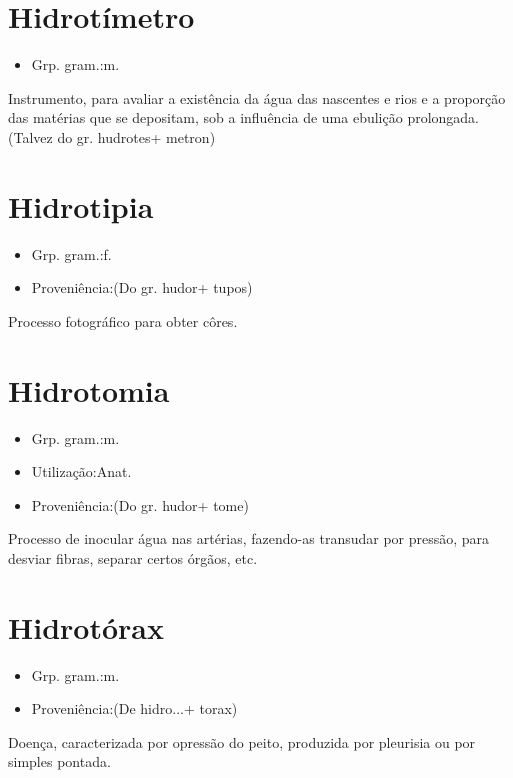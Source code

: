 \documentclass{article}
\begin{document}
\section{Hidrotímetro}
\begin{itemize}
\item {Grp. gram.:m.}
\end{itemize}
Instrumento, para avaliar a existência da água das nascentes e rios e a proporção das matérias que se depositam, sob a influência de uma ebulição prolongada.
(Talvez do gr. \textunderscore hudrotes\textunderscore  + \textunderscore metron\textunderscore )
\section{Hidrotipia}
\begin{itemize}
\item {Grp. gram.:f.}
\end{itemize}
\begin{itemize}
\item {Proveniência:(Do gr. \textunderscore hudor\textunderscore  + \textunderscore tupos\textunderscore )}
\end{itemize}
Processo fotográfico para obter côres.
\section{Hidrotomia}
\begin{itemize}
\item {Grp. gram.:m.}
\end{itemize}
\begin{itemize}
\item {Utilização:Anat.}
\end{itemize}
\begin{itemize}
\item {Proveniência:(Do gr. \textunderscore hudor\textunderscore  + \textunderscore tome\textunderscore )}
\end{itemize}
Processo de inocular água nas artérias, fazendo-as transudar por pressão, para desviar fibras, separar certos órgãos, etc.
\section{Hidrotórax}
\begin{itemize}
\item {Grp. gram.:m.}
\end{itemize}
\begin{itemize}
\item {Proveniência:(De \textunderscore hidro...\textunderscore  + \textunderscore torax\textunderscore )}
\end{itemize}
Doença, caracterizada por opressão do peito, produzida por pleurisia ou por simples pontada.
\end{document}
